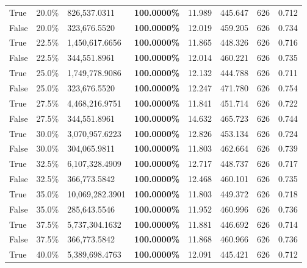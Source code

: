 \begin{table}[H]
\begin{tabular}{lllrllll}
\cline{1-8}
True & 20.0\% & 826,537.0311 & \bfseries \color{red} 100.0000\% & 11.989 & 445.647 & 626 & 0.712 \\
\cline{1-8}
False & 20.0\% & 323,676.5520 & \bfseries \color{red} 100.0000\% & 12.019 & 459.205 & 626 & 0.734 \\
\cline{1-8}
True & 22.5\% & 1,450,617.6656 & \bfseries \color{red} 100.0000\% & 11.865 & 448.326 & 626 & 0.716 \\
\cline{1-8}
False & 22.5\% & 344,551.8961 & \bfseries \color{red} 100.0000\% & 12.014 & 460.221 & 626 & 0.735 \\
\cline{1-8}
True & 25.0\% & 1,749,778.9086 & \bfseries \color{red} 100.0000\% & 12.132 & 444.788 & 626 & 0.711 \\
\cline{1-8}
False & 25.0\% & 323,676.5520 & \bfseries \color{red} 100.0000\% & 12.247 & 471.780 & 626 & 0.754 \\
\cline{1-8}
True & 27.5\% & 4,468,216.9751 & \bfseries \color{red} 100.0000\% & 11.841 & 451.714 & 626 & 0.722 \\
\cline{1-8}
False & 27.5\% & 344,551.8961 & \bfseries \color{red} 100.0000\% & 14.632 & 465.723 & 626 & 0.744 \\
\cline{1-8}
True & 30.0\% & 3,070,957.6223 & \bfseries \color{red} 100.0000\% & 12.826 & 453.134 & 626 & 0.724 \\
\cline{1-8}
False & 30.0\% & 304,065.9811 & \bfseries \color{red} 100.0000\% & 11.803 & 462.664 & 626 & 0.739 \\
\cline{1-8}
True & 32.5\% & 6,107,328.4909 & \bfseries \color{red} 100.0000\% & 12.717 & 448.737 & 626 & 0.717 \\
\cline{1-8}
False & 32.5\% & 366,773.5842 & \bfseries \color{red} 100.0000\% & 12.468 & 460.101 & 626 & 0.735 \\
\cline{1-8}
True & 35.0\% & 10,069,282.3901 & \bfseries \color{red} 100.0000\% & 11.803 & 449.372 & 626 & 0.718 \\
\cline{1-8}
False & 35.0\% & \color{red} 285,643.5546 & \bfseries \color{red} 100.0000\% & 11.952 & 460.996 & 626 & 0.736 \\
\cline{1-8}
True & 37.5\% & 5,737,304.1632 & \bfseries \color{red} 100.0000\% & 11.881 & 446.692 & 626 & 0.714 \\
\cline{1-8}
False & 37.5\% & 366,773.5842 & \bfseries \color{red} 100.0000\% & 11.868 & 460.966 & 626 & 0.736 \\
\cline{1-8}
True & 40.0\% & 5,389,698.4763 & \bfseries \color{red} 100.0000\% & 12.091 & 445.421 & 626 & 0.712 \\

\end{tabular}
\end{table}
